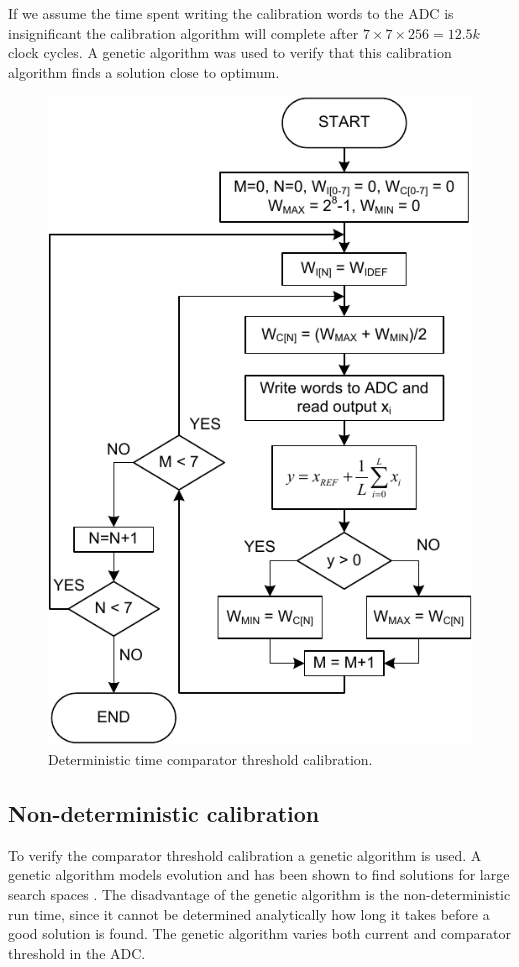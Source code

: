 If we assume the
time spent writing 
the calibration words to the ADC is insignificant the calibration algorithm will
complete after  $7 \times 7 \times 256 = 12.5k$ clock
cycles. A genetic algorithm was used to verify that this calibration
algorithm finds a solution close to optimum. 
\begin{figure}[htbp]
\centerline{ \includegraphics[width=\myfigwidthb]{graphics/cal_off}}
  \caption{Deterministic time comparator threshold calibration.}
  \label{cbscfig:cal_off}
\end{figure}

\subsection{Non-deterministic calibration}
To verify the comparator threshold calibration a genetic algorithm is used.
A genetic algorithm
models evolution and has been shown to find solutions for
large search spaces \cite{back97}. The disadvantage of the genetic algorithm is the
non-deterministic run time, since it cannot be determined analytically
how long it takes before a good solution is found. The genetic
algorithm varies both current and comparator
threshold in the ADC. 


